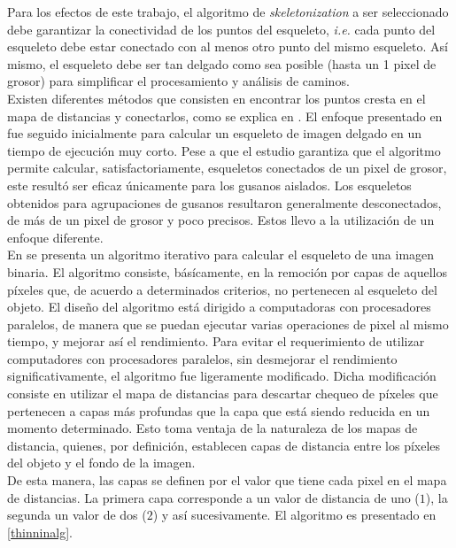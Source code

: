 Para los efectos de este trabajo, el algoritmo de \emph{skeletonization} a ser
seleccionado debe garantizar la conectividad de los puntos del esqueleto, \emph{i.e.}
cada punto del esqueleto debe estar conectado con al menos otro punto del mismo
esqueleto. As\'i mismo, el esqueleto debe ser tan delgado como sea posible 
(hasta un 1 pixel de grosor) para simplificar el procesamiento y an\'alisis de caminos.\\

Existen diferentes m\'etodos que consisten en encontrar los puntos cresta en el
mapa de distancias y conectarlos, como se explica en \cite{maxima,euclideancentre,ridgedt}. 
El enfoque presentado en \cite{maxima} fue seguido inicialmente para calcular un esqueleto
de imagen delgado en un tiempo de ejecuci\'on muy corto. Pese a que el estudio garantiza
que el algoritmo permite calcular, satisfactoriamente, esqueletos conectados de un pixel
de grosor, este result\'o ser eficaz \'unicamente para los gusanos aislados. Los esqueletos
obtenidos para agrupaciones de gusanos resultaron generalmente desconectados, 
de m\'as de un pixel de grosor y poco precisos. Estos llevo a la utilizaci\'on
de un enfoque diferente.\\

En \cite{thinning} se presenta un algoritmo iterativo para calcular el esqueleto de
una imagen binaria. El algoritmo consiste, b\'as\'icamente, en la remoci\'on por capas
de aquellos p\'ixeles que, de acuerdo a determinados criterios, no pertenecen al esqueleto
del objeto. El dise\~no del algoritmo est\'a dirigido a computadoras con procesadores 
paralelos, de manera que se puedan ejecutar varias operaciones de pixel al mismo tiempo,
y mejorar as\'i el rendimiento. Para evitar el requerimiento de utilizar computadores
con procesadores paralelos, sin desmejorar el rendimiento significativamente,
el algoritmo fue ligeramente modificado. Dicha modificaci\'on consiste en utilizar
el mapa de distancias para descartar chequeo de p\'ixeles que pertenecen a capas
m\'as profundas que la capa que est\'a siendo reducida en un momento determinado.
Esto toma ventaja de la naturaleza de los mapas de distancia, quienes, por definici\'on,
establecen capas de distancia entre los p\'ixeles del objeto y el fondo de la imagen.\\
De esta manera, las capas se definen por el valor que tiene cada pixel en el mapa 
de distancias. La primera capa corresponde a un valor de distancia de uno ($1$), la segunda
un valor de dos ($2$) y as\'i sucesivamente. El algoritmo es presentado en \ref{thinninalg}.

